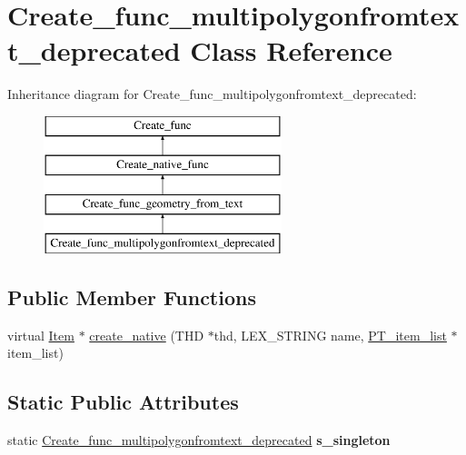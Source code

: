 \hypertarget{classCreate__func__multipolygonfromtext__deprecated}{}\section{Create\+\_\+func\+\_\+multipolygonfromtext\+\_\+deprecated Class Reference}
\label{classCreate__func__multipolygonfromtext__deprecated}
Inheritance diagram for Create\+\_\+func\+\_\+multipolygonfromtext\+\_\+deprecated\+:\begin{figure}[H]
\begin{center}
\leavevmode
\includegraphics[height=4.000000cm]{classCreate__func__multipolygonfromtext__deprecated}
\end{center}
\end{figure}
\subsection*{Public Member Functions}
\begin{DoxyCompactItemize}
\item 
virtual \mbox{\hyperlink{classItem}{Item}} $\ast$ \mbox{\hyperlink{classCreate__func__multipolygonfromtext__deprecated_aa97a2a418f12fe63eb87ac20182a7790}{create\+\_\+native}} (T\+HD $\ast$thd, L\+E\+X\+\_\+\+S\+T\+R\+I\+NG name, \mbox{\hyperlink{classPT__item__list}{P\+T\+\_\+item\+\_\+list}} $\ast$item\+\_\+list)
\end{DoxyCompactItemize}
\subsection*{Static Public Attributes}
\begin{DoxyCompactItemize}
\item 
\mbox{\label{classCreate__func__multipolygonfromtext__deprecated_a90055ac24fcc71da84b4039a5b501dc3}} 
static \mbox{\hyperlink{classCreate__func__multipolygonfromtext__deprecated}{Create\+\_\+func\+\_\+multipolygonfromtext\+\_\+deprecated}} {\bfseries s\+\_\+singleton}
\end{DoxyCompactItemize}
